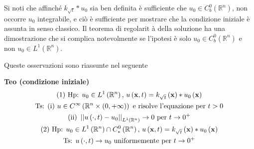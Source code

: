 \documentclass{article}
\begin{document}
Si noti che affinch\'{e} $k_{\sqrt{t}}\ast u_{0}$ sia ben definita \`{e}
sufficiente che $u_{0}\in C_{b}^{0}\left( 
\mathbb{R}
^{n}\right) $, non
occorre $u_{0}$ integrabile, e ci\`{o} \`{e} sufficiente per mostrare che la
condizione iniziale \`{e} assunta in senso classico. Il teorema di regolarit%
\`{a} della soluzione ha una dimostrazione che si complica notevolmente se
l'ipotesi \`{e} solo $u_{0}\in C_{b}^{0}\left( 
\mathbb{R}
^{n}\right) $ e non $u_{0}\in L^{1}\left( 
\mathbb{R}
^{n}\right) $.

Queste osservazioni sono riassunte nel seguente

\textbf{Teo (condizione iniziale)}%
\begin{gather*}
\text{(1) Hp: }u_{0}\in L^{1}\left( 
\mathbb{R}
^{n}\right) \text{, }u\left( \mathbf{x},t\right) =k_{\sqrt{t}}\left( \mathbf{%
x}\right) \ast u_{0}\left( \mathbf{x}\right) \\
\text{Ts: (i) }u\in C^{\infty }\left( 
\mathbb{R}
^{n}\times \left( 0,+\infty \right) \right) \text{ e risolve l'equazione per 
}t>0 \\
\text{(ii) }\left\vert \left\vert u\left( \cdot ,t\right) -u_{0}\right\vert
\right\vert _{L^{1}\left( 
\mathbb{R}
^{n}\right) }\rightarrow 0\text{ per }t\rightarrow 0^{+} \\
\text{(2) Hp: }u_{0}\in L^{1}\left( 
\mathbb{R}
^{n}\right) \cap C_{\ast }^{0}\left( 
\mathbb{R}
^{n}\right) \text{, }u\left( \mathbf{x},t\right) =k_{\sqrt{t}}\left( \mathbf{%
x}\right) \ast u_{0}\left( \mathbf{x}\right) \\
\text{Ts: }u\left( \cdot ,t\right) \rightarrow u_{0}\text{ uniformemente per 
}t\rightarrow 0^{+}
\end{gather*}
\end{document}
